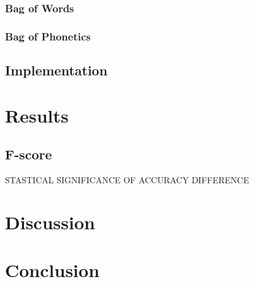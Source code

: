 \documentclass[10pt]{article}
\begin{document}
\subsubsection{Bag of Words}
\label{sec-2-3-1}
\subsubsection{Bag of Phonetics}
\label{sec-2-3-2}
\subsection{Implementation}
\label{sec-2-4}
\section{Results}
\label{sec-3}
\subsection{F-score}
\label{sec-3-1}

STASTICAL SIGNIFICANCE OF ACCURACY DIFFERENCE
\section{Discussion}
\label{sec-4}
\section{Conclusion}
\label{sec-5}





\end{document}
